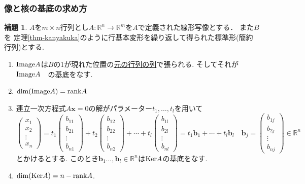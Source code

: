 \documentclass[dvipdfmx,a4paper,11pt]{article}
\newcommand{\R}{\mathbb{R}}
\theoremstyle{definition}
\newtheorem{lem}[thm]{補題}
\begin{document}
\subsubsection{像と核の基底の求め方}

\begin{tcolorbox}[
    colback = white,
    colframe = green!35!black,
    fonttitle = \bfseries,
    breakable = true]
    \begin{lem}\cite[補題2.6]{M}
$A$を$m \times n$行列とし$A: \R^n \to \R^m$を$A$で定義された線形写像とする． 
また$B$を
定理\ref{thm-kanyakuka}のように行基本変形を繰り返して得られた標準形(簡約行列)とする.    
\begin{enumerate}
   \setlength{\parskip}{0cm} 
  \setlength{\itemsep}{0cm}
 \item ${\rm Image}A$は$B$の1が現れた位置の\underline{元の行列の列}で張られる. そしてそれが${\rm Image}A$　の基底をなす. 
 \item$\dim({\rm Image}A)={\rm rank} A$
 \item 連立一次方程式$A\bm{x}=0$の解がパラメーター$t_1, \ldots, t_l$を用いて
 $$
 \begin{pmatrix}
x_1\\x_2\\ \vdots \\x_n
\end{pmatrix}
=
t_1 
\begin{pmatrix}
b_{11}\\b_{21}\\ \vdots \\b_{n1}
\end{pmatrix}
+
t_2
\begin{pmatrix}
b_{12}\\b_{22}\\ \vdots \\b_{n2}
\end{pmatrix}
+\cdots+
t_l
\begin{pmatrix}
b_{1l}\\b_{2l}\\ \vdots \\b_{nl}
\end{pmatrix}
=
t_1\bm{b}_1+\cdots + t_l \bm{b}_l
\quad
\bm{b}_j=
\begin{pmatrix}
b_{1j}\\b_{2j}\\ \vdots \\b_{nj}
\end{pmatrix}
\in \R^n
 $$
 とかけるとする. 
 このとき$\bm{b}_1 \ldots, \bm{b}_l \in \R^n$は${\rm Ker}A$の基底をなす. 
 \item $ \dim ({\rm Ker}A)=n-{\rm rank} A$.
  \end{enumerate}
  \end{lem}
  \end{tcolorbox}
\end{document}
